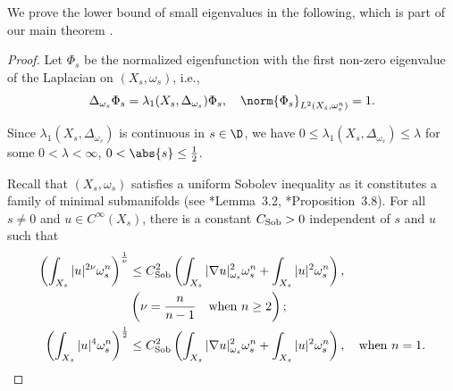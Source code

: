 \documentclass[12pt]{amsart}
\begin{document}
We prove the lower bound of {small eigenvalues} in the following, which is part of our main theorem  
.
\begin{proof}
    Let $\Phi_s$ be the normalized eigenfunction with the first non-zero 
    eigenvalue of the Laplacian on $(X_s, \omega_s)$, i.e., 
    \[
    \Delta_{\omega_s} \Phi_s = \lambda_1(X_s, \Delta_{\omega_s}) \Phi_s,
    \quad \norm{\Phi_s}_{L^2(X_s, \omega_s^n)} = 1.
    \]

    Since $\lambda_1(X_s, \Delta_{\omega_s})$ is continuous
    in $s \in \D$, we have $0 \leq \lambda_1(X_s, \Delta_{\omega_s})
    \leq \lambda$ for some $0 < \lambda < \infty$, $0 < \abs{s}
    \leq \frac{1}{2}$.

    Recall that $(X_s, \omega_s)$ satisfies a uniform Sobolev 
    inequality as it constitutes a family of minimal submanifolds (see \cite{Tosatti2010}*{Lemma~3.2}, \cite{DNGG2022}*{Proposition~3.8}). For all $s \neq 0$ and $u \in C^\infty(X_s)$, there 
    is a constant $C_{\rm Sob} > 0$ independent of $s$ and $u$ such that
    \begin{align}
    \label{eqn:uniform_sobolev}
    \begin{split}
    \left( \int_{X_s} |u|^{2\nu} \omega_s^n \right)^{\frac{1}{\nu}} &\leq C_{\rm Sob}^2 
    \left(\int_{X_s} |\nabla u|^2_{\omega_s} \omega_s^n +\int_{X_s} |u|^2 \omega_s^n\right),
    \\ 
    &
    \left(\nu = \frac{n}{n - 1} \quad \text{when }n\geq 2\right);\\
    \left( \int_{X_s} |u|^{4} \omega_s^n \right)^{\frac{1}{2}} &\leq C_{\rm Sob}^2 
    \left(\int_{X_s} |\nabla u|^2_{\omega_s} \omega_s^n + \int_{X_s} |u|^2 \omega_s^n\right), 
    \quad \text{when } n = 1.
    \end{split}
    \end{align}


\end{proof}
\end{document}
